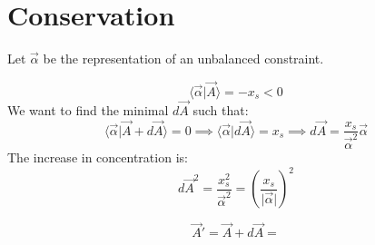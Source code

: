 \documentclass[aps,12pt]{revtex4}
\begin{document}
\section{Conservation}

Let $\vec \alpha$ be the representation of an unbalanced constraint.

\begin{equation}
	\langle \vec \alpha \vert \vec A \rangle = - x_s < 0
\end{equation}
We want to find the minimal $d \vec A$ such that:
\begin{equation}
	\langle \vec \alpha \vert \vec A + d\vec A \rangle = 0 \implies \langle \vec \alpha \vert d \vec A \rangle = x_s \implies d \vec A = \dfrac{x_s}{\vec\alpha^2} \vec \alpha
\end{equation}
The increase in concentration is:
\begin{equation}
	d \vec A^2 = \dfrac{x_s^2}{\vec \alpha^2} = \left( \dfrac{x_s}{\vert\vec\alpha\vert}\right) ^2
\end{equation}

\begin{equation}
	\vec A ' = \vec A + d \vec A = 
\end{equation}


%
%
 	
\end{document}
